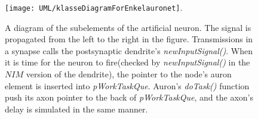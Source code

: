 \begin{figure}[hbt!p]
	\centering
	\texttt{[image: UML/klasseDiagramForEnkelauronet]}.
	\caption[A sketch of the subelement design of a node in the ANN, enabling the intracellular communication scheme used for signal propagation in the artificial neuron]
				{A diagram of the subelements of the artificial neuron.
				The signal is propagated from the left to the right in the figure.
				Transmissions in a synapse calls the postsynaptic dendrite's \emph{newInputSignal()}.
				When it is time for the neuron to fire(checked by \emph{newInputSignal()} in the $NIM$ version of the dendrite), the pointer to the node's auron element is inserted into \emph{pWorkTaskQue}.
				Auron's \emph{doTask()} function push its axon pointer to the back of \emph{pWorkTaskQue}, and the axon's delay is simulated in the same manner.
				}
	\label{figUMLClassDiagramForASingleNeuron}
\end{figure}

